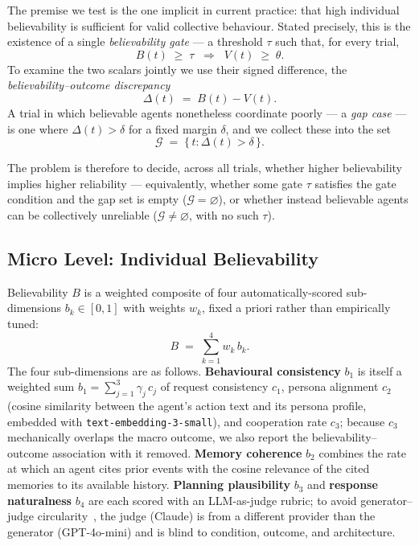 \documentclass[runningheads]{llncs}
\begin{document}
The premise we test is the one implicit in current practice: that high individual believability
is sufficient for valid collective behaviour. Stated precisely, this is the existence of a single
\emph{believability gate} --- a threshold $\tau$ such that, for every trial,
\begin{equation}\label{eq:gate}
B(t)\;\geq\;\tau \;\;\Longrightarrow\;\; V(t)\;\geq\;\theta .
\end{equation}
To examine the two scalars jointly we use their signed difference, the
\emph{believability--outcome discrepancy}
\begin{equation}\label{eq:discrepancy}
\Delta(t)\;=\;B(t)-V(t).
\end{equation}
A trial in which believable agents nonetheless coordinate poorly --- a \emph{gap case} --- is
one where $\Delta(t)>\delta$ for a fixed margin $\delta$, and we collect these into the set
\begin{equation}\label{eq:gapset}
\mathcal{G}\;=\;\{\, t : \Delta(t) > \delta \,\}.
\end{equation}

The problem is therefore to decide, across all trials, whether higher believability implies
higher reliability --- equivalently, whether some gate $\tau$ satisfies the gate condition and
the gap set is empty ($\mathcal{G}=\varnothing$), or whether instead believable agents can be
collectively unreliable ($\mathcal{G}\neq\varnothing$, with no such $\tau$).



\subsection{Micro Level: Individual Believability}\label{sec:micro}
Believability $B$ is a weighted composite of four automatically-scored sub-dimensions
$b_k\in[0,1]$ with weights $w_k$, fixed a priori rather than empirically tuned:
\begin{equation}\label{eq:believability}
B \;=\; \sum_{k=1}^{4} w_k\, b_k .
\end{equation}
The four sub-dimensions are as follows. \textbf{Behavioural consistency} $b_1$ is itself a
weighted sum $b_1=\sum_{j=1}^{3}\gamma_j\, c_j$ of request consistency $c_1$, persona alignment
$c_2$ (cosine similarity between the agent's action text and its persona profile, embedded with
\texttt{text-embedding-3-small}), and cooperation rate $c_3$; because $c_3$ mechanically overlaps
the macro outcome, we also report the believability--outcome association with it removed.
\textbf{Memory coherence} $b_2$ combines the rate at which an agent cites prior events with the
cosine relevance of the cited memories to its available history. \textbf{Planning plausibility}
$b_3$ and \textbf{response naturalness} $b_4$ are each scored with an LLM-as-judge rubric; to
avoid generator--judge circularity~\cite{zheng2023judging,pan2025agentrewardbench}, the judge
(Claude) is from a different provider than the generator (GPT-4o-mini) and is blind to condition,
outcome, and architecture.
\end{document}

